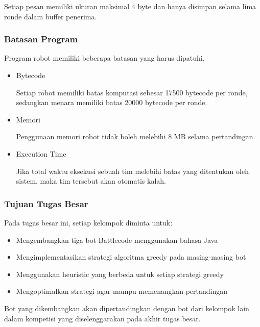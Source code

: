 Setiap pesan memiliki ukuran maksimal 4 byte dan hanya disimpan selama lima ronde dalam buffer penerima.

\subsubsection{Batasan Program}

Program robot memiliki beberapa batasan yang harus dipatuhi.

\begin{itemize}

\item Bytecode

Setiap robot memiliki batas komputasi sebesar 17500 bytecode per ronde, sedangkan menara memiliki batas 20000 bytecode per ronde.

\item Memori

Penggunaan memori robot tidak boleh melebihi 8 MB selama pertandingan.

\item Execution Time 

Jika total waktu eksekusi sebuah tim melebihi batas yang ditentukan oleh sistem, maka tim tersebut akan otomatis kalah.

\end{itemize}

\subsubsection{Tujuan Tugas Besar}

Pada tugas besar ini, setiap kelompok diminta untuk:

\begin{itemize}
\item Mengembangkan tiga bot Battlecode menggunakan bahasa Java
\item Mengimplementasikan strategi algoritma greedy pada masing-masing bot
\item Menggunakan heuristic yang berbeda untuk setiap strategi greedy
\item Mengoptimalkan strategi agar mampu memenangkan pertandingan
\end{itemize}

Bot yang dikembangkan akan dipertandingkan dengan bot dari kelompok lain dalam kompetisi yang diselenggarakan pada akhir tugas besar.
